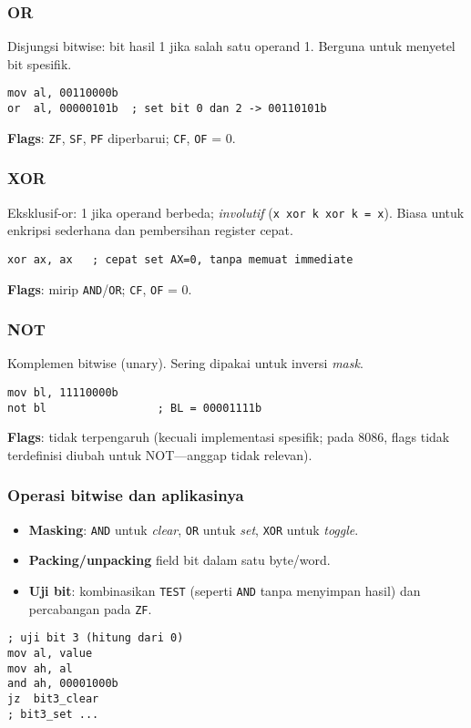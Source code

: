 \subsubsection{OR}
Disjungsi bitwise: bit hasil 1 jika salah satu operand 1. Berguna untuk menyetel bit spesifik.
\begin{verbatim}
mov al, 00110000b
or  al, 00000101b  ; set bit 0 dan 2 -> 00110101b
\end{verbatim}
\textbf{Flags}: \texttt{ZF}, \texttt{SF}, \texttt{PF} diperbarui; \texttt{CF}, \texttt{OF} = 0.

\subsubsection{XOR}
Eksklusif-or: 1 jika operand berbeda; \textit{involutif} (\texttt{x xor k xor k = x}). Biasa untuk enkripsi sederhana dan pembersihan register cepat.
\begin{verbatim}
xor ax, ax   ; cepat set AX=0, tanpa memuat immediate
\end{verbatim}
\textbf{Flags}: mirip \texttt{AND}/\texttt{OR}; \texttt{CF}, \texttt{OF} = 0.

\subsubsection{NOT}
Komplemen bitwise (unary). Sering dipakai untuk inversi \textit{mask}.
\begin{verbatim}
mov bl, 11110000b
not bl                 ; BL = 00001111b
\end{verbatim}
\textbf{Flags}: tidak terpengaruh (kecuali implementasi spesifik; pada 8086, flags tidak terdefinisi diubah untuk NOT—anggap tidak relevan).

\subsubsection{Operasi bitwise dan aplikasinya}
\begin{itemize}
  \item \textbf{Masking}: \texttt{AND} untuk \textit{clear}, \texttt{OR} untuk \textit{set}, \texttt{XOR} untuk \textit{toggle}.
  \item \textbf{Packing/unpacking} field bit dalam satu byte/word.
  \item \textbf{Uji bit}: kombinasikan \texttt{TEST} (seperti \texttt{AND} tanpa menyimpan hasil) dan percabangan pada \texttt{ZF}.
\end{itemize}
\begin{verbatim}
; uji bit 3 (hitung dari 0)
mov al, value
mov ah, al
and ah, 00001000b
jz  bit3_clear
; bit3_set ...
\end{verbatim}

